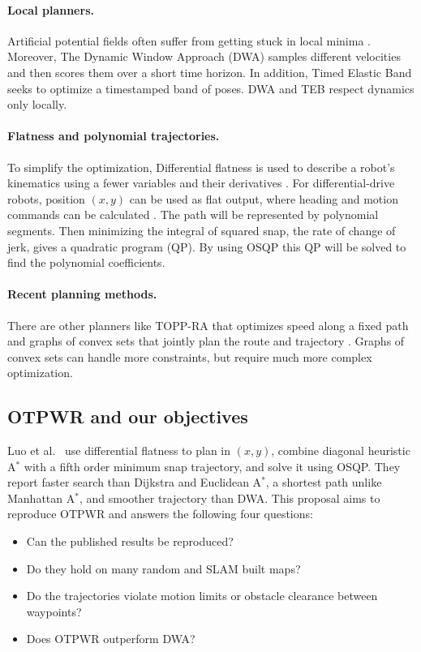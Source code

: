 \paragraph{Local planners.} Artificial potential fields often
\citep{khatib1986realtime} suffer from getting stuck in local minima \citep{koren1991potential}.
Moreover, The Dynamic Window Approach (DWA) \citep{fox1997dwa,yao2024improved} samples different velocities and then scores them over a short time horizon.
In addition, Timed Elastic Band \citep{rosmann2017integrated} seeks to optimize a timestamped band of poses. DWA and TEB respect dynamics only locally.

\paragraph{Flatness and polynomial trajectories.}
To simplify the optimization, Differential flatness is used to describe a robot's kinematics using a fewer variables
and their derivatives \citep{fliess1995flatness}. For differential-drive robots,
position $(x,y)$ can be used as flat output, where heading and motion commands can be calculated \citep{murray1995flat}. The path will be represented by polynomial segments. Then minimizing the integral of squared snap,
the rate of change of jerk, gives a quadratic program (QP). By using OSQP
\citep{stellato2020osqp} this QP will be solved to find the polynomial coefficients.

\paragraph{Recent planning methods.}
There are other planners like TOPP-RA that
optimizes speed along a fixed path \citep{pham2018toppra} and graphs of convex sets that jointly plan the
route and trajectory \citep{marcucci2023gcs}. Graphs of convex sets can
handle more constraints, but require much more complex optimization.
\subsection{OTPWR and our objectives}
\label{sec:otpwr}

Luo et al.\ \citep{luo2024otpwr} use differential flatness to plan in $(x,y)$, combine diagonal heuristic A$^\ast$ with a
fifth order minimum snap trajectory, and solve it using OSQP. They report faster search than Dijkstra and Euclidean A$^\ast$, a shortest path unlike Manhattan A$^\ast$, and smoother trajectory than DWA. This proposal aims to reproduce
OTPWR and answers the following four questions:

\begin{itemize}
    \item[(Q1)] Can the published results be reproduced?
    \item[(Q2)] Do they hold on many random and SLAM built maps?
    \item[(Q3)] Do the trajectories violate motion limits or obstacle clearance between waypoints?
    \item[(Q4)] Does OTPWR outperform DWA?
\end{itemize}


